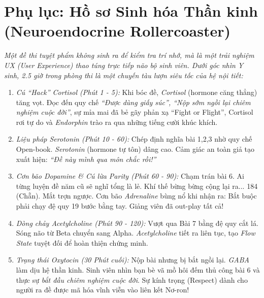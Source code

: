 \documentclass{article}
\begin{document}
\section*{Phụ lục: Hồ sơ Sinh hóa Thần kinh (Neuroendocrine Rollercoaster)}
\textit{Một đề thi tuyệt phẩm không sinh ra để kiểm tra trí nhớ, mà là một trải nghiệm UX (User Experience) thao túng trực tiếp não bộ sinh viên. Dưới góc nhìn Y sinh, 2.5 giờ trong phòng thi là một chuyến tàu lượn siêu tốc của hệ nội tiết:}
\begin{enumerate}
	\item \emph{Cú ``Hack'' Cortisol (Phút 1 - 5):} Khi bóc đề, \textit{Cortisol} (hormone căng thẳng) tăng vọt. Đọc đến quy chế \textit{``Được dùng giấy súc'', ``Nộp sớm ngồi lại chiêm nghiệm cuộc đời''}, sự mỉa mai đã bẻ gãy phản xạ ``Fight or Flight'', Cortisol rơi tự do và \textit{Endorphin} trào ra qua những tiếng cười khúc khích.
	\item \emph{Liệu pháp Serotonin (Phút 10 - 60):} Chép định nghĩa bài 1,2,3 nhờ quy chế Open-book. \textit{Serotonin} (hormone tự tôn) dâng cao. Cảm giác an toàn giả tạo xuất hiện: \textit{``Đề này mình qua môn chắc rồi!''}
	\item \emph{Cơn bão Dopamine \& Cú lừa Parity (Phút 60 - 90):} Chạm trán bài 6. Ai từng luyện đề năm cũ sẽ nghĩ tổng là lẻ. Khí thế bừng bừng cộng lại ra... 184 (Chẵn). Mắt trợn ngược. Cơn bão \textit{Adrenaline} bùng nổ khi nhận ra: Bắt buộc phải chạy đệ quy 19 bước bằng tay. Giảng viên đã out-play tất cả!
	\item \emph{Dòng chảy Acetylcholine (Phút 90 - 120):} Vượt qua Bài 7 bằng đệ quy cắt lá. Sóng não từ Beta chuyển sang Alpha. \textit{Acetylcholine} tiết ra liên tục, tạo \textit{Flow State} tuyệt đối để hoàn thiện chứng minh.
	\item \emph{Trạng thái Oxytocin (30 Phút cuối):} Nộp bài nhưng bị bắt ngồi lại. \textit{GABA} làm dịu hệ thần kinh. Sinh viên nhìn bạn bè vã mồ hôi đếm thủ công bài 6 và thực sự \emph{\textit{bắt đầu chiêm nghiệm cuộc đời}}. Sự kính trọng (Respect) dành cho người ra đề được mã hóa vĩnh viễn vào liên kết Nơ-ron!
\end{enumerate}

\printbibliography[heading=bibintoc]
\end{document}
